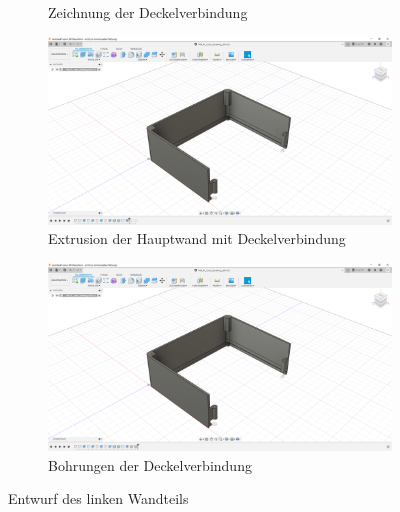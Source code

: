 \begin{figure}[H]
\begin{subfigure}[t]{.3\linewidth}
		\caption[Zeichnung der Deckelverbindung]{Zeichnung der Deckelverbindung}
		\label{fig:design-left-09}
	\end{subfigure}
	\begin{subfigure}[t]{.3\linewidth}
		\includegraphics[width=\linewidth]{img/konstruktion_gehaeuse_links_010.png}
		\caption[Extrusion der Hauptwand mit Deckelverbindung]{Extrusion der Hauptwand mit Deckelverbindung}
		\label{fig:design-left-10}
	\end{subfigure}
	\begin{subfigure}[t]{.3\linewidth}
		\includegraphics[width=\linewidth]{img/konstruktion_gehaeuse_links_011.png}
		\caption[Bohrungen der Deckelverbindung]{Bohrungen der Deckelverbindung}
		\label{fig:design-left-11}
	\end{subfigure}
	\caption[Entwurf des linken Wandteils]{Entwurf des linken Wandteils}
	\label{fig:design-left}
\end{figure}\par
\newpage

